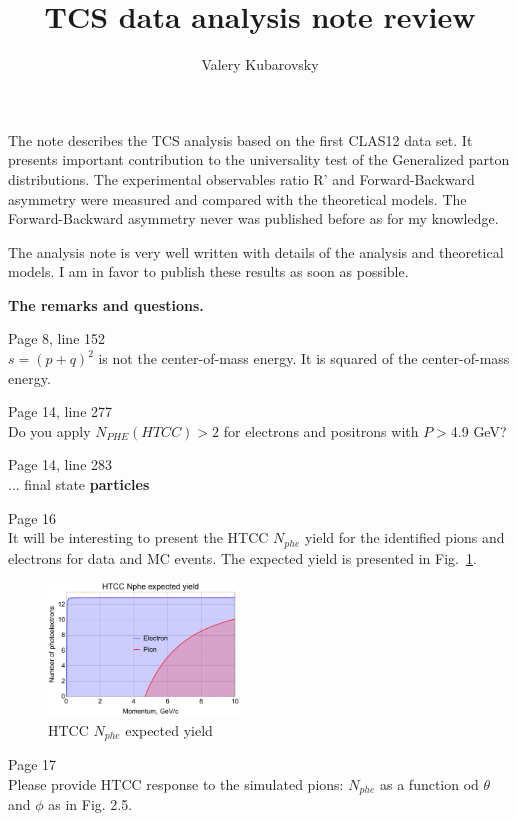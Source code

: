\documentclass[11pt]{article}
\title{TCS data analysis note review}
\author{Valery Kubarovsky}
\date{}                                           %
\begin{document}
\maketitle

The note describes the TCS analysis based on the first CLAS12 data set.
It presents important contribution to the universality test of the Generalized parton distributions.
The experimental observables ratio R' and Forward-Backward asymmetry were measured and compared with the theoretical models. The Forward-Backward asymmetry never was published before as for my knowledge.

The analysis note is very well written with details of the analysis and theoretical models. 
I am in favor to publish these results as soon as possible.

{\bf The remarks and questions.}

Page 8, line 152\\
$s=(p+q)^2$ is not the center-of-mass energy. It is squared of the center-of-mass energy.

Page 14, line 277\\
Do you apply $N_{PHE}(HTCC) > 2$ for electrons and positrons with $P>$4.9 GeV? 


Page 14, line 283\\
... final state {\bf particles}

Page 16\\
It will be interesting to present the HTCC $N_{phe}$ yield for the identified pions and electrons for data and MC events.
The expected yield is presented in Fig.~\ref{HTCC}.


\begin{figure}[h]
\begin{center}
\includegraphics[width=0.45\textwidth]{HTCC.pdf}
\caption{ HTCC $N_{phe}$ expected yield  }
\label{HTCC}
\end{center}
\end{figure} 


Page 17\\
Please provide HTCC response to the simulated pions: $N_{phe}$ as a function od $\theta$ and $\phi$ as in Fig. 2.5.
\end{document}
